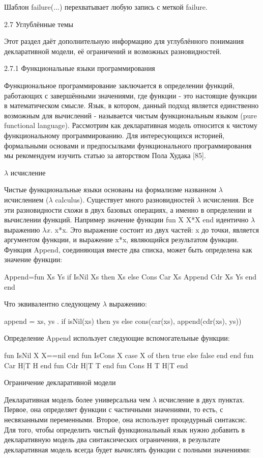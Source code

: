 Шаблон failure(...) перехватывает любую запись с меткой failure.

2.7 Углублённые темы

Этот раздел даёт дополнительную информацию для углублённого понимания декларативной модели, её ограничений и возможных разновидностей.

2.7.1 Функциональные языки программирования

Функциональное программирование заключается в определении функций, работающих с завершёнными значениями, где функции - это настоящие функции в математическом смысле. Язык, в котором, данный подход является единственно возможным для вычислений - называется чистым функциональным языком (pure functional language). Рассмотрим как декларативная модель относится к чистому функциональному программированию. Для интересующихся историей, формальными основами и предпосылками функционального программирования мы рекомендуем изучить статью за авторством Пола Худака [85].

$\lambda$ исчисление

Чистые функциональные языки основаны на формализме названном $\lambda$ исчислением ($\lambda$ calculus). Существует много разновидностей $\lambda$ исчисления. Все эти разновидности схожи в двух базовых операциях, а именно в определении и вычислении функций. Например значение функции fun { X} X*X end идентично $\lambda$ выражению $\lambda x$. x*x. Это выражение состоит из двух частей: x до точки, является аргументом функции, и выражение x*x, являющийся результатом функции. Функция Append, соединяющая вместе два списка, может быть определена как значение функции:

Append=fun { Xs Ys}
if {IsNil Xs} then Xs
else {Cons {Car Xs} {Append {Cdr Xs} Ys}}
end
end

Что эквивалентно следующему $\lambda$ выражению:

append = xs, ys . if isNil(xs) then ys
else cons(car(xs), append(cdr(xs), ys))

Определение Append использует следующие вспомогательные функции:

fun
{IsNil X} X==nil end
fun
{IsCons X} case X of  then true else false end end
fun
{Car H|T} H end
fun
{Cdr H|T} T end
fun
{Cons H T} H|T end

Ограничение декларативной модели

Декларативная модель более универсальна чем $\lambda$ исчисление в двух пунктах. Первое, она определяет функции с частичными значениями, то есть, с несвязанными переменными. Второе, она использует процедурный синтаксис. Для того, чтобы определить чистый функциональный язык нужно добавить в декларативную модель два синтаксических ограничения, в результате декларативная модель всегда будет вычислять функции с полными значениями:

